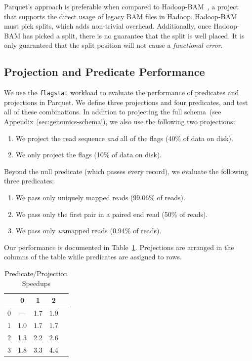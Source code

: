 \documentclass[masters]{ucbthesis}
\begin{document}
Parquet's approach is preferable when compared to Hadoop-BAM~\cite{niemenmaa12}, a project that supports
the direct usage of legacy BAM files in Hadoop. Hadoop-BAM must pick splits, which adds non-trivial overhead.
Additionally, once Hadoop-BAM has picked a split, there is no guarantee that the split is well placed. It is only
guaranteed that the split position will not cause a \emph{functional error}.

\subsection{Projection and Predicate Performance}
\label{sec:projection-predicate-performance}

We use the \texttt{flagstat} workload to evaluate the performance of predicates and projections in Parquet.
We define three projections and four predicates, and test all of these combinations. In addition to projecting the
full schema~(see Appendix~\ref{sec:genomics-schema}), we also use the following two projections:

\begin{enumerate}
\item We project the read sequence \emph{and} all of the flags (40\% of data on disk).
\item We only project the flags (10\% of data on disk).
\end{enumerate}

Beyond the null predicate (which passes every record), we evaluate the following three predicates:

\begin{enumerate}
\item We pass only uniquely mapped reads (99.06\% of reads).
\item We pass only the first pair in a paired end read (50\% of reads).
\item We pass only \emph{un}mapped reads (0.94\% of reads).
\end{enumerate}

Our performance is documented in Table~\ref{tab:ppp}. Projections are arranged in the columns of the table
while predicates are assigned to rows.

\begin{table}[h]
\caption{Predicate/Projection Speedups}
\label{tab:ppp}
\begin{center}
\begin{tabular}{ l | c c c c }
\hline
& 0 & 1 & 2 \\
\hline
\hline
0 & --- & 1.7 & 1.9 \\
1 & 1.0 & 1.7 & 1.7 \\
2 & 1.3 & 2.2 & 2.6 \\
3 & 1.8 & 3.3 & 4.4 \\
\hline
\end{tabular}
\end{center}
\end{table}
\end{document}
